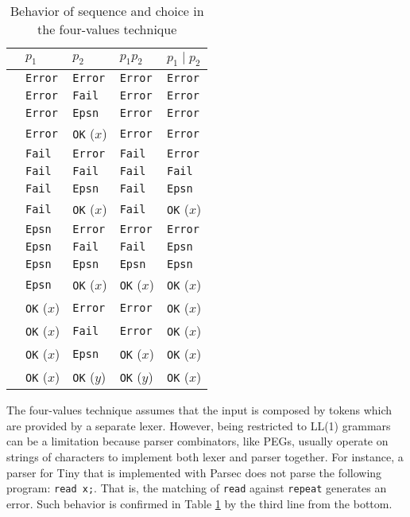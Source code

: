 \documentclass[3p,12pt,singlecolumn]{elsarticle}
\begin{document}
\begin{table}[t]
\begin{center}
\begin{tabular}{p{1cm}p{2cm}p{2cm}p{2cm}p{2cm}}
\hline
& $p_1$ & $p_2$ & $p_1 p_2$ & $p_1 \; | \; p_2$\\
\hline
& \texttt{Error} & \texttt{Error} & \texttt{Error} & \texttt{Error} \\
& \texttt{Error} & \texttt{Fail} & \texttt{Error} & \texttt{Error} \\
& \texttt{Error} & \texttt{Epsn} & \texttt{Error} & \texttt{Error} \\
& \texttt{Error} & \texttt{OK} ($x$) & \texttt{Error} & \texttt{Error} \\
& \texttt{Fail} & \texttt{Error} & \texttt{Fail} & \texttt{Error} \\
& \texttt{Fail} & \texttt{Fail} & \texttt{Fail} & \texttt{Fail} \\
& \texttt{Fail} & \texttt{Epsn} & \texttt{Fail} & \texttt{Epsn} \\
& \texttt{Fail} & \texttt{OK} ($x$) & \texttt{Fail} & \texttt{OK} ($x$) \\
& \texttt{Epsn} & \texttt{Error} & \texttt{Error} & \texttt{Error} \\
& \texttt{Epsn} & \texttt{Fail} & \texttt{Fail} & \texttt{Epsn} \\
& \texttt{Epsn} & \texttt{Epsn} & \texttt{Epsn} & \texttt{Epsn} \\
& \texttt{Epsn} & \texttt{OK} ($x$) & \texttt{OK} ($x$) & \texttt{OK} ($x$) \\
& \texttt{OK} ($x$) & \texttt{Error} & \texttt{Error} & \texttt{OK} ($x$) \\
& \texttt{OK} ($x$) & \texttt{Fail} & \texttt{Error} & \texttt{OK} ($x$) \\
& \texttt{OK} ($x$) & \texttt{Epsn} & \texttt{OK} ($x$) & \texttt{OK} ($x$) \\
& \texttt{OK} ($x$) & \texttt{OK} ($y$) & \texttt{OK} ($y$) & \texttt{OK} ($x$) \\
\end{tabular}
\end{center}
\caption{Behavior of sequence and choice in the four-values technique}
\label{tab:fv}
\end{table}

The four-values technique assumes that the input is composed by tokens
which are provided by a separate lexer.
However, being restricted to LL(1) grammars can be a limitation
because parser combinators, like PEGs, usually operate on strings of
characters to implement both lexer and parser together.
For instance, a parser for Tiny that is implemented with Parsec
\cite{leijen2001parsec} does not parse the following program:
\verb'read x;'.
That is, the matching of \verb'read' against \verb'repeat' generates
an error.
Such behavior is confirmed in Table \ref{tab:fv} by the third line
from the bottom.
\end{document}
